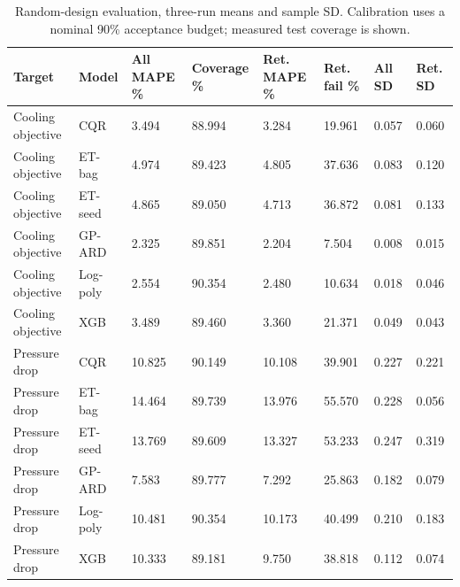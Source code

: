 \begin{table}[htbp]\centering\small\setlength{\tabcolsep}{3pt}\begin{tabular}{llllllll}
\toprule
Target & Model & All MAPE \% & Coverage \% & Ret. MAPE \% & Ret. fail \% & All SD & Ret. SD\\\midrule
Cooling objective & CQR & 3.494 & 88.994 & 3.284 & 19.961 & 0.057 & 0.060\\
Cooling objective & ET-bag & 4.974 & 89.423 & 4.805 & 37.636 & 0.083 & 0.120\\
Cooling objective & ET-seed & 4.865 & 89.050 & 4.713 & 36.872 & 0.081 & 0.133\\
Cooling objective & GP-ARD & 2.325 & 89.851 & 2.204 & 7.504 & 0.008 & 0.015\\
Cooling objective & Log-poly & 2.554 & 90.354 & 2.480 & 10.634 & 0.018 & 0.046\\
Cooling objective & XGB & 3.489 & 89.460 & 3.360 & 21.371 & 0.049 & 0.043\\
Pressure drop & CQR & 10.825 & 90.149 & 10.108 & 39.901 & 0.227 & 0.221\\
Pressure drop & ET-bag & 14.464 & 89.739 & 13.976 & 55.570 & 0.228 & 0.056\\
Pressure drop & ET-seed & 13.769 & 89.609 & 13.327 & 53.233 & 0.247 & 0.319\\
Pressure drop & GP-ARD & 7.583 & 89.777 & 7.292 & 25.863 & 0.182 & 0.079\\
Pressure drop & Log-poly & 10.481 & 90.354 & 10.173 & 40.499 & 0.210 & 0.183\\
Pressure drop & XGB & 10.333 & 89.181 & 9.750 & 38.818 & 0.112 & 0.074\\
\bottomrule\end{tabular}\caption{Random-design evaluation, three-run means and sample SD. Calibration uses a nominal 90\% acceptance budget; measured test coverage is shown.}\label{tab:ubend-grouped}\end{table}
